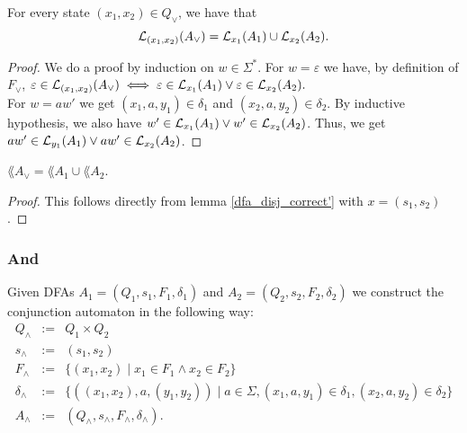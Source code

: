 \begin{lemma}
    \label{dfa_disj_correct'}
    For every state $(x_1, x_2) \in Q_\vee$, we have that
    \begin{equation*}
        \mathcal{L}_{(x_1, x_2)}(A_\vee) = \mathcal{L}_{x_1}(A_1) \cup \mathcal{L}_{x_2}(A_2).
    \end{equation*}
\end{lemma}
\begin{proof}
    We do a proof by induction on $w \in \Sigma^*$.
    For $w = \varepsilon$ we have, by definition of $F_\vee$, 
    $%
    \varepsilon \in \acc{(x_1, x_2)}{A_\vee} 
    \iff \varepsilon \in \acc{x_1}{A_1} \vee \varepsilon \in \acc{x_2}{A_2}.
    $%
    \\
    For $w = aw'$ we get $(x_1, a, y_1) \in \delta_1$ and $(x_2, a, y_2) \in \delta_2$.
    By inductive hypothesis, we also have $w' \in \mathcal{L}_{x_1}(A_1) \vee w' \in \mathcal{L}_{x_2}(A_2)$.
    Thus, we get $aw' \in \mathcal{L}_{y_1}(A_1) \vee aw' \in \mathcal{L}_{x_2}(A_2)$.
\end{proof}

\begin{lemma}
    $\lang{A_\vee} = \lang{A_1} \cup \lang{A_2}$.
    \label{dfa_disj_correct}
\end{lemma}
\begin{proof}
    This follows directly from lemma \ref{dfa_disj_correct'} with $x = (s_1, s_2)$.
\end{proof}




\subsubsection{And}
\begin{definition}
    Given DFAs 
    $A_1=(Q_1, s_1, F_1, \delta_1)$ and $A_2=(Q_2, s_2, F_2, \delta_2)$ 
    we construct the conjunction automaton  in the following way:
    \begin{eqnarray*}
        Q_\wedge &:=& Q_1 \times Q_2 \\
        s_\wedge &:=& (s_1, s_2) \\
        F_\wedge &:=& \{(x_1,x_2) \; | \; x_1 \in F_1 \wedge x_2 \in F_2\} \\
        \delta_\wedge &:=& \{( (x_1, x_2),a,(y_1, y_2)) \; | \; a \in \Sigma, (x_1, a, y_1) \in \delta_1, (x_2, a, y_2) \in \delta_2 \} \\
        A_\wedge &:=& (Q_\wedge, s_\wedge, F_\wedge, \delta_\wedge).
    \end{eqnarray*}
\end{definition}

